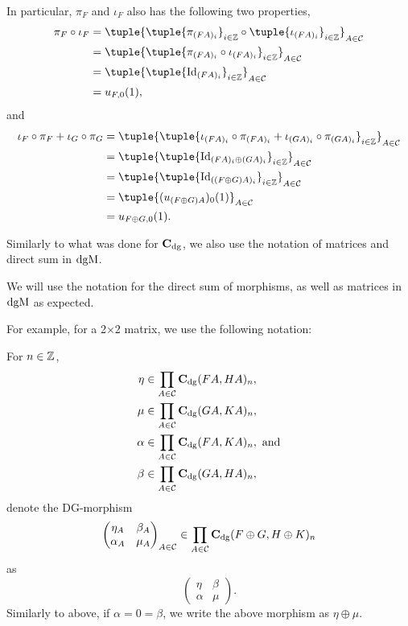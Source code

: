 \begin{remark}
    In particular, \( \pi_F \) and \( \iota_F \) also has the following two properties,
    \begin{align*}
        \pi_F \circ \iota_F &= \tuple{ \tuple{ \pi_{(F A)_i} }_{i \in \Zb} \circ \tuple{ \iota_{(F A)_i} }_{i \in \Zb} }_{A \in \Cc} \\
        &= \tuple{ \tuple{ \pi_{(F A)_i} \circ \iota_{(F A)_i} }_{i \in \Zb} }_{A \in \Cc} \\
        &= \tuple{ \tuple{ \Id_{(F A)_i} }_{i \in \Zb} }_{A \in \Cc} \\
        &= u_{F, 0}(1),
    \end{align*}
    and
    \begin{align*}
        \iota_F \circ \pi_F + \iota_G \circ \pi_G &= \tuple{ \tuple{\iota_{(F A)_i} \circ \pi_{(F A)_i} + \iota_{(G A)_i} \circ \pi_{(G A)_i} }_{i \in \Zb} }_{A \in \Cc} \\
        &= \tuple{ \tuple{ \Id_{(F A)_i \oplus (G A)_i} }_{i \in \Zb} }_{A \in \Cc} \\
        &= \tuple{ \tuple{ \Id_{((F \oplus G) A)_i} }_{i \in \Zb} }_{A \in \Cc} \\
        &= \tuple{ (u_{(F \oplus G) A})_0 (1)}_{A \in \Cc} \\
        &= u_{F \oplus G, 0} (1).
    \end{align*}
\end{remark}

Similarly to what was done for \( \operatorname{\mathbf{C}}_{\operatorname{dg}} \), we also use the notation of matrices and direct sum in \( \operatorname{dgM} \).
\begin{notation}
    We will use the notation for the direct sum of morphisms, as well as matrices in \( \operatorname{dgM} \) as expected.

    For example, for a 2×2 matrix, we use the following notation:

    For \( n \in {\mathbb{Z}} \),
    \begin{align*}
        \eta &\in \prod_{A \in {\mathcal{C}}} \operatorname{\mathbf{C}}_{\operatorname{dg}}(F A, H A)_n, \\
        \mu &\in \prod_{A \in {\mathcal{C}}} \operatorname{\mathbf{C}}_{\operatorname{dg}}(G A, K A)_n, \\
        \alpha &\in \prod_{A \in {\mathcal{C}}} \operatorname{\mathbf{C}}_{\operatorname{dg}}(F A, K A)_n, \text{ and} \\
        \beta &\in \prod_{A \in {\mathcal{C}}} \operatorname{\mathbf{C}}_{\operatorname{dg}}(G A, H A)_n,
    \end{align*}
    denote the DG-morphism
    \[
        \begin{pmatrix}
            \eta_A & \beta_A \\
            \alpha_A & \mu_A
        \end{pmatrix}_{A \in {\mathcal{C}}}
        \in
        \prod_{A \in {\mathcal{C}}} \operatorname{\mathbf{C}}_{\operatorname{dg}}(F \oplus G, H \oplus K)_n
    \]
    as
    \[
        \begin{pmatrix}
            \eta & \beta \\
            \alpha & \mu
        \end{pmatrix}.
    \]
    Similarly to above, if \( \alpha = 0 = \beta \), we write the above morphism as \( \eta \oplus \mu \).
\end{notation}

